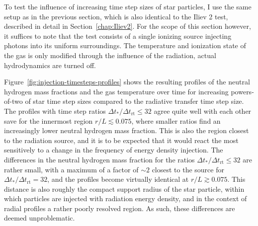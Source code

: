 To test the influence of increasing time step sizes of star particles, I use the same setup as in
the previous section, which is also identical to the Iliev 2 test, described in detail in
Section~\ref{chap:Iliev2}. For the scope of this section however, it suffices to note that the test
consists of a single ionizing source injecting photons into its uniform surroundings. The
temperature and ionization state of the gas is only modified through the influence of the radiation,
actual hydrodynamics are turned off.

Figure~\ref{fig:injection-timesteps-profiles} shows the resulting profiles of the neutral hydrogen
mass fractions and the gas temperature over time for increasing powers-of-two of star time step
sizes compared to the radiative transfer time step size. The profiles with time step ratios $\Delta
t_* / \Delta t_{\mathrm{rt}} \leq 32$ agree quite well with each other save for the innermost
region $r / L \lesssim 0.075$, where smaller ratios find an increasingly lower neutral hydrogen
mass fraction. This is also the region closest to the radiation source, and it is to be expected
that it would react the most sensitively to a change in the frequency of energy density injection.
The differences in the neutral hydrogen mass fraction for the ratios $\Delta t_* / \Delta
t_{\mathrm{rt}} \leq 32$ are rather small, with a maximum of a factor of $\sim 2$ closest to the
source for $\Delta t_* / \Delta t_{\mathrm{rt}} = 32$, and the profiles become virtually identical
at $r / L \gtrsim 0.075$. This distance is also roughly the compact support radius of the star
particle, within which particles are injected with radiation energy density, and in the context of
radial profiles a rather poorly resolved region. As such, these differences are deemed
unproblematic.

